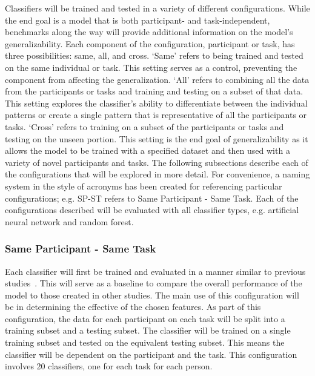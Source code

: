 \documentclass[11pt]{article}
\begin{document}
Classifiers will be trained and tested in a variety of different configurations. While the end goal is a model that is both participant- and task-independent, benchmarks along the way will provide additional information on the model's generalizability. Each component of the configuration, participant or task, has three possibilities: same, all, and cross. `Same' refers to being trained and tested on the same individual or task. This setting serves as a control, preventing the component from affecting the generalization. `All' refers to combining all the data from the participants or tasks and training and testing on a subset of that data. This setting explores the classifier's ability to differentiate between the individual patterns or create a single pattern that is representative of all the participants or tasks. `Cross' refers to training on a subset of the participants or tasks and testing on the unseen portion. This setting is the end goal of generalizability as it allows the model to be trained with a specified dataset and then used with a variety of novel participants and tasks. The following subsections describe each of the configurations that will be explored in more detail. For convenience, a naming system in the style of acronyms has been created for referencing particular configurations; e.g. SP-ST refers to Same Participant - Same Task. Each of the configurations described will be evaluated with all classifier types, e.g. artificial neural network and random forest.

\subsubsection{Same Participant - Same Task}
Each classifier will first be trained and evaluated in a manner similar to previous studies~\cite{Wilson, Zhang, Wang_R, Yin}. This will serve as a baseline to compare the overall performance of the model to those created in other studies. The main use of this configuration will be in determining the effective of the chosen features. As part of this configuration, the data for each participant on each task will be split into a training subset and a testing subset. The classifier will be trained on a single training subset and tested on the equivalent testing subset. This means the classifier will be dependent on the participant and the task. This configuration involves 20 classifiers, one for each task for each person.
\end{document}

